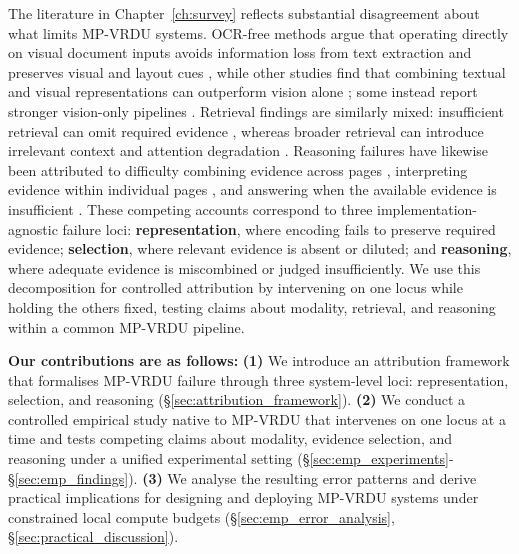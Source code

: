 The literature in Chapter~\ref{ch:survey} reflects substantial disagreement about what limits MP-VRDU systems. OCR-free methods argue that operating directly on visual document inputs avoids information loss from text extraction and preserves visual and layout cues \citep{tanaka2025vdocrag,zheng2026doc,cho2024m3docrag}, while other studies find that combining textual and visual representations can outperform vision alone \citep{hannan2026docslm,han2025mdocagent,suri2025visdom}; some instead report stronger vision-only pipelines \citep{liu2025resolving}. Retrieval findings are similarly mixed: insufficient retrieval can omit required evidence \citep{yan2026docseeker,li2026avir}, whereas broader retrieval can introduce irrelevant context and attention degradation \citep{liu2024lost,wang2024needle,pez2025enhancing}. Reasoning failures have likewise been attributed to difficulty combining evidence across pages \citep{zheng2026doc}, interpreting evidence within individual pages \citep{guo2026end}, and answering when the available evidence is insufficient \citep{landeghem2023document,zhang2025dream,ma2024mmlongbench}. These competing accounts correspond to three implementation-agnostic failure loci: \textbf{representation}, where encoding fails to preserve required evidence; \textbf{selection}, where relevant evidence is absent or diluted; and \textbf{reasoning}, where adequate evidence is miscombined or judged insufficiently. We use this decomposition for controlled attribution by intervening on one locus while holding the others fixed, testing claims about modality, retrieval, and reasoning within a common MP-VRDU pipeline.


\textbf{Our contributions are as follows:} \textbf{(1)} We introduce an attribution framework that formalises MP-VRDU failure through three system-level loci: representation, selection, and reasoning (\S\ref{sec:attribution_framework}). \textbf{(2)} We conduct a controlled empirical study native to MP-VRDU that intervenes on one locus at a time and tests competing claims about modality, evidence selection, and reasoning under a unified experimental setting (\S\ref{sec:emp_experiments}-\S\ref{sec:emp_findings}). \textbf{(3)} We analyse the resulting error patterns and derive practical implications for designing and deploying MP-VRDU systems under constrained local compute budgets (\S\ref{sec:emp_error_analysis}, \S\ref{sec:practical_discussion}).


